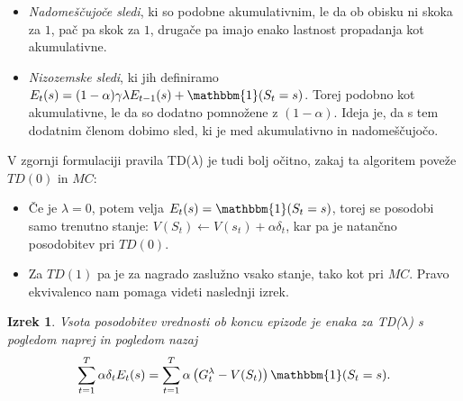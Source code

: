\documentclass[12pt,a4paper]{amsart}
\theoremstyle{definition} %
\theoremstyle{plain} %
\newtheorem{izrek}[definicija]{Izrek}
\begin{document}
\begin{itemize}
    \item \textit{Nadomeščujoče sledi}, ki so podobne akumulativnim, le da ob obisku ni skoka za 
            $1$, pač pa skok za $1$, drugače pa imajo enako lastnost propadanja kot akumulativne. 
    \item \textit{Nizozemske sledi}, ki jih definiramo $E_t(s) = (1 - \alpha) \gamma \lambda 
            E_{t-1}(s) + \mathbbm{1}(S_t = s)$. Torej podobno kot akumulativne, le da so dodatno 
            pomnožene z $(1 - \alpha)$. Ideja je, da s tem dodatnim členom dobimo sled, ki je med 
            akumulativno in nadomeščujočo.
\end{itemize}

V zgornji formulaciji pravila TD($\lambda$) je tudi bolj očitno, zakaj ta algoritem poveže $TD(0)$ 
in $MC$:

\begin{itemize}
    \item Če je $\lambda = 0$, potem velja $E_t(s) = \mathbbm{1}(S_t = s)$, torej se posodobi samo
            trenutno stanje: $V(S_t) \leftarrow V(s_t) + \alpha \delta_t$, kar pa je natančno 
            posodobitev pri $TD(0)$.
    \item Za $TD(1)$ pa je za nagrado zaslužno vsako stanje, tako kot pri $MC$. Pravo ekvivalenco 
            nam pomaga videti naslednji izrek.
\end{itemize}

\begin{izrek}
    Vsota posodobitev vrednosti ob koncu epizode je enaka za TD($\lambda$) s pogledom naprej in 
    pogledom nazaj
    $$
    \sum_{t=1}^T \alpha \delta_t E_t(s) = \sum_{t=1}^T \alpha \left( G_t^\lambda - V(S_t) \right) 
    \mathbbm{1}(S_t = s).
    $$
\end{izrek}
\end{document}
